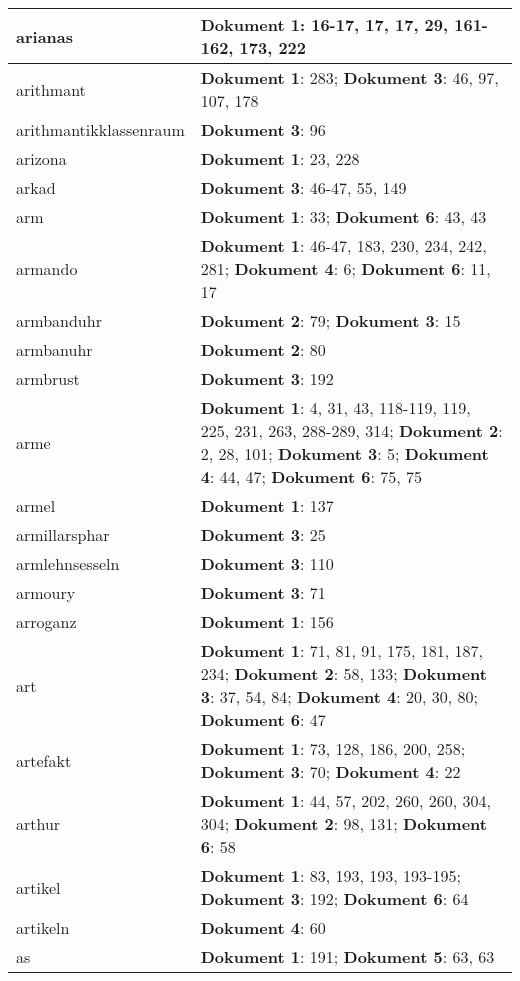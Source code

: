 \documentclass[a5paper]{article}
\begin{document}
\begin{longtable}[l]{|l|p{3in}|}
\hline
arianas & \textbf{Dokument 1}: 16-17, 17, 17, 29, 161-162, 173, 222 \\
\hline
arithmant & \textbf{Dokument 1}: 283; \textbf{Dokument 3}: 46, 97, 107, 178 \\
\hline
arithmantikklassenraum & \textbf{Dokument 3}: 96 \\
\hline
arizona & \textbf{Dokument 1}: 23, 228 \\
\hline
arkad & \textbf{Dokument 3}: 46-47, 55, 149 \\
\hline
arm & \textbf{Dokument 1}: 33; \textbf{Dokument 6}: 43, 43 \\
\hline
armando & \textbf{Dokument 1}: 46-47, 183, 230, 234, 242, 281; \textbf{Dokument 4}: 6; \textbf{Dokument 6}: 11, 17 \\
\hline
armbanduhr & \textbf{Dokument 2}: 79; \textbf{Dokument 3}: 15 \\
\hline
armbanuhr & \textbf{Dokument 2}: 80 \\
\hline
armbrust & \textbf{Dokument 3}: 192 \\
\hline
arme & \textbf{Dokument 1}: 4, 31, 43, 118-119, 119, 225, 231, 263, 288-289, 314; \textbf{Dokument 2}: 2, 28, 101; \textbf{Dokument 3}: 5; \textbf{Dokument 4}: 44, 47; \textbf{Dokument 6}: 75, 75 \\
\hline
armel & \textbf{Dokument 1}: 137 \\
\hline
armillarsphar & \textbf{Dokument 3}: 25 \\
\hline
armlehnsesseln & \textbf{Dokument 3}: 110 \\
\hline
armoury & \textbf{Dokument 3}: 71 \\
\hline
arroganz & \textbf{Dokument 1}: 156 \\
\hline
art & \textbf{Dokument 1}: 71, 81, 91, 175, 181, 187, 234; \textbf{Dokument 2}: 58, 133; \textbf{Dokument 3}: 37, 54, 84; \textbf{Dokument 4}: 20, 30, 80; \textbf{Dokument 6}: 47 \\
\hline
artefakt & \textbf{Dokument 1}: 73, 128, 186, 200, 258; \textbf{Dokument 3}: 70; \textbf{Dokument 4}: 22 \\
\hline
arthur & \textbf{Dokument 1}: 44, 57, 202, 260, 260, 304, 304; \textbf{Dokument 2}: 98, 131; \textbf{Dokument 6}: 58 \\
\hline
artikel & \textbf{Dokument 1}: 83, 193, 193, 193-195; \textbf{Dokument 3}: 192; \textbf{Dokument 6}: 64 \\
\hline
artikeln & \textbf{Dokument 4}: 60 \\
\hline
as & \textbf{Dokument 1}: 191; \textbf{Dokument 5}: 63, 63 \\

\end{longtable}
\end{document}
